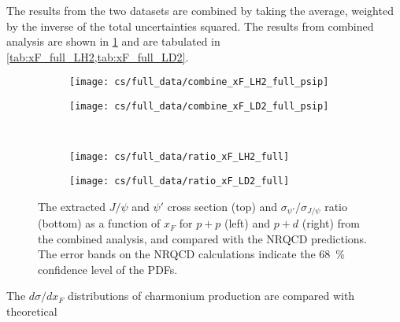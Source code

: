 \documentclass[../main.tex]{subfiles}
\begin{document}
The results from the two datasets are combined by taking the average, weighted by
the inverse of the total uncertainties squared.
The results from combined analysis are shown in \cref{fig:cs_xF_full} and are tabulated in
\cref{tab:xF_full_LH2,tab:xF_full_LD2}.
\begin{figure}
	\centering
	\begin{subfigure}{0.45\linewidth}
		\texttt{[image: cs/full\_data/combine\_xF\_LH2\_full\_psip]}
	\end{subfigure}
	\begin{subfigure}{0.45\linewidth}
		\texttt{[image: cs/full\_data/combine\_xF\_LD2\_full\_psip]}
	\end{subfigure}\\
	\begin{subfigure}{0.45\linewidth}
		\texttt{[image: cs/full\_data/ratio\_xF\_LH2\_full]}
	\end{subfigure}
	\begin{subfigure}{0.45\linewidth}
		\texttt{[image: cs/full\_data/ratio\_xF\_LD2\_full]}
	\end{subfigure}
	\caption{The extracted $J/\psi$ and $\psi'$ cross section (top) and $\sigma_{\psi'}/\sigma_{J/\psi}$
		ratio (bottom) as a function of $x_F$ for $p+p$ (left) and $p+d$ (right) from
		the combined analysis, and compared with the NRQCD predictions.
		The error bands on the NRQCD calculations indicate the \SI{68}{\percent} confidence level of the PDFs.}
	\label{fig:cs_xF_full}
\end{figure}
\begin{table}[h!]
	\centering
	\caption{Cross section as a function of $x_F$ (in \unit{\nano\barn\per nucleon}) and the
		$\sigma_{\psi'}/\sigma_{J/\psi}$ ratio for $p+p$ extracted from the combined analysis, with
		their statistical and systematic uncertainties and the average $x_F$ in each bin.}
	
	\label{tab:xF_full_LH2}
\end{table}
\begin{table}[h!]
	\centering
	\caption{Cross section as a function of $x_F$ (in \unit{\nano\barn\per nucleon}) and the
		$\sigma_{\psi'}/\sigma_{J/\psi}$ ratio for $p+d$ extracted from the combined analysis, with
		their statistical and systematic uncertainties and the average $x_F$ in each bin.}
	
	\label{tab:xF_full_LD2}
\end{table}
The $d\sigma/dx_F$ distributions of charmonium production are compared with theoretical
\end{document}
